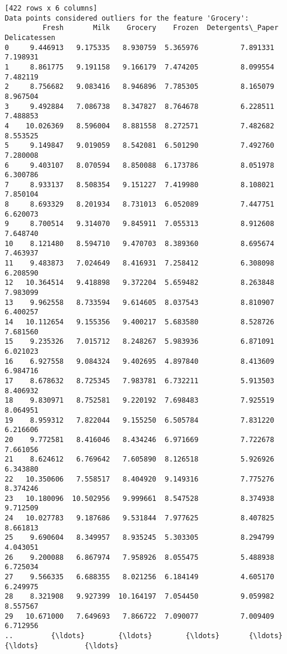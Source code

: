 \documentclass[11pt]{article}
\begin{document}
\begin{Verbatim}[commandchars=\\\{\}]
[422 rows x 6 columns]
Data points considered outliers for the feature 'Grocery':
         Fresh       Milk    Grocery    Frozen  Detergents\_Paper  Delicatessen
0     9.446913   9.175335   8.930759  5.365976          7.891331      7.198931
1     8.861775   9.191158   9.166179  7.474205          8.099554      7.482119
2     8.756682   9.083416   8.946896  7.785305          8.165079      8.967504
3     9.492884   7.086738   8.347827  8.764678          6.228511      7.488853
4    10.026369   8.596004   8.881558  8.272571          7.482682      8.553525
5     9.149847   9.019059   8.542081  6.501290          7.492760      7.280008
6     9.403107   8.070594   8.850088  6.173786          8.051978      6.300786
7     8.933137   8.508354   9.151227  7.419980          8.108021      7.850104
8     8.693329   8.201934   8.731013  6.052089          7.447751      6.620073
9     8.700514   9.314070   9.845911  7.055313          8.912608      7.648740
10    8.121480   8.594710   9.470703  8.389360          8.695674      7.463937
11    9.483873   7.024649   8.416931  7.258412          6.308098      6.208590
12   10.364514   9.418898   9.372204  5.659482          8.263848      7.983099
13    9.962558   8.733594   9.614605  8.037543          8.810907      6.400257
14   10.112654   9.155356   9.400217  5.683580          8.528726      7.681560
15    9.235326   7.015712   8.248267  5.983936          6.871091      6.021023
16    6.927558   9.084324   9.402695  4.897840          8.413609      6.984716
17    8.678632   8.725345   7.983781  6.732211          5.913503      8.406932
18    9.830971   8.752581   9.220192  7.698483          7.925519      8.064951
19    8.959312   7.822044   9.155250  6.505784          7.831220      6.216606
20    9.772581   8.416046   8.434246  6.971669          7.722678      7.661056
21    8.624612   6.769642   7.605890  8.126518          5.926926      6.343880
22   10.350606   7.558517   8.404920  9.149316          7.775276      8.374246
23   10.180096  10.502956   9.999661  8.547528          8.374938      9.712509
24   10.027783   9.187686   9.531844  7.977625          8.407825      8.661813
25    9.690604   8.349957   8.935245  5.303305          8.294799      4.043051
26    9.200088   6.867974   7.958926  8.055475          5.488938      6.725034
27    9.566335   6.688355   8.021256  6.184149          4.605170      6.249975
28    8.321908   9.927399  10.164197  7.054450          9.059982      8.557567
29   10.671000   7.649693   7.866722  7.090077          7.009409      6.712956
..         {\ldots}        {\ldots}        {\ldots}       {\ldots}               {\ldots}           {\ldots}

\end{Verbatim}
\end{document}
